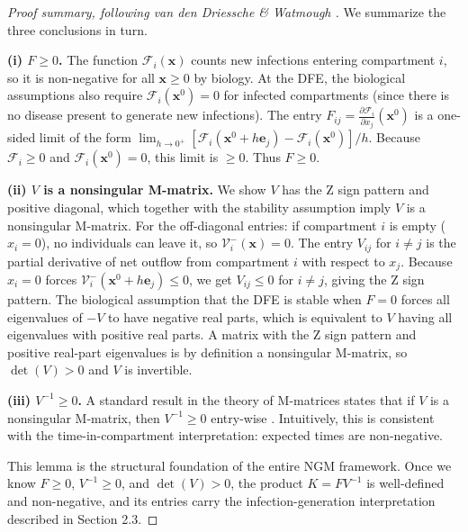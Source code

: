 \documentclass[12pt]{article}
\theoremstyle{plain}
\theoremstyle{definition}
\begin{document}
\begin{proof}[Proof summary, following van den Driessche \& Watmough \cite{vddriessche2002}]
We summarize the three conclusions in turn.

\textbf{(i) $F \geq 0$.} The function $\mathcal{F}_i(\mathbf{x})$ counts new infections
entering compartment $i$, so it is non-negative for all $\mathbf{x} \geq 0$ by biology. At
the DFE, the biological assumptions also require $\mathcal{F}_i(\mathbf{x}^0) = 0$ for
infected compartments (since there is no disease present to generate new infections). The
entry $F_{ij} = \frac{\partial \mathcal{F}_i}{\partial x_j}(\mathbf{x}^0)$ is a one-sided
limit of the form $\lim_{h \to 0^+} [\mathcal{F}_i(\mathbf{x}^0 + h\mathbf{e}_j) -
\mathcal{F}_i(\mathbf{x}^0)]/h$. Because $\mathcal{F}_i \geq 0$ and
$\mathcal{F}_i(\mathbf{x}^0) = 0$, this limit is $\geq 0$. Thus $F \geq 0$.

\textbf{(ii) $V$ is a nonsingular M-matrix.} We show $V$ has the Z sign pattern and
positive diagonal, which together with the stability assumption imply $V$ is a nonsingular
M-matrix. For the off-diagonal entries: if compartment $i$ is empty ($x_i = 0$), no
individuals can leave it, so $\mathcal{V}^-_i(\mathbf{x}) = 0$. The entry $V_{ij}$ for
$i \neq j$ is the partial derivative of net outflow from compartment $i$ with respect to
$x_j$. Because $x_i = 0$ forces $\mathcal{V}^-_i(\mathbf{x}^0 + h\mathbf{e}_j) \leq 0$,
we get $V_{ij} \leq 0$ for $i \neq j$, giving the Z sign pattern. The biological assumption
that the DFE is stable when $F = 0$ forces all eigenvalues of $-V$ to have negative real
parts, which is equivalent to $V$ having all eigenvalues with positive real parts. A matrix
with the Z sign pattern and positive real-part eigenvalues is by definition a nonsingular
M-matrix, so $\det(V) > 0$ and $V$ is invertible.

\textbf{(iii) $V^{-1} \geq 0$.} A standard result in the theory of M-matrices states that
if $V$ is a nonsingular M-matrix, then $V^{-1} \geq 0$ entry-wise \cite{vddriessche2002}.
Intuitively, this is consistent with the time-in-compartment interpretation: expected times
are non-negative.

This lemma is the structural foundation of the entire NGM framework. Once we know
$F \geq 0$, $V^{-1} \geq 0$, and $\det(V) > 0$, the product $K = FV^{-1}$ is
well-defined and non-negative, and its entries carry the infection-generation interpretation
described in Section 2.3.
\end{proof}
\end{document}
